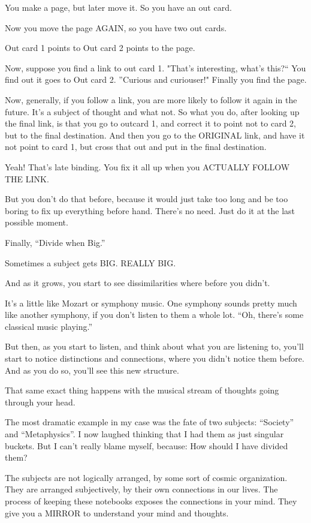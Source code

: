 \documentclass[oneside]{book}
\begin{document}
You make a page, but later move it. So you have an out card.

Now you move the page AGAIN, so you have two out cards.

Out card 1 points to Out card 2 points to the page.

Now, suppose you find a link to out card 1. "That's interesting,
what's this?`` You find out it goes to Out card 2. ''Curious and
curiouser!" Finally you find the page.

Now, generally, if you follow a link, you are more likely to follow it
again in the future. It's a subject of thought and what not. So what
you do, after looking up the final link, is that you go to outcard 1,
and correct it to point not to card 2, but to the final
destination. And then you go to the ORIGINAL link, and have it not
point to card 1, but cross that out and put in the final destination.

Yeah! That's late binding. You fix it all up when you ACTUALLY FOLLOW
THE LINK.

But you don't do that before, because it would just take too long and
be too boring to fix up everything before hand. There's no need. Just
do it at the last possible moment.

Finally, ``Divide when Big.''

Sometimes a subject gets BIG. REALLY BIG.

And as it grows, you start to see dissimilarities where before you
didn't.

It's a little like Mozart or symphony music. One symphony sounds
pretty much like another symphony, if you don't listen to them a whole
lot. ``Oh, there's some classical music playing.''

But then, as you start to listen, and think about what you are
listening to, you'll start to notice distinctions and connections,
where you didn't notice them before. And as you do so, you'll see this
new structure.

That same exact thing happens with the musical stream of thoughts
going through your head.

The most dramatic example in my case was the fate of two subjects:
``Society'' and ``Metaphysics''. I now laughed thinking that I had them as
just singular buckets. But I can't really blame myself, because: How
should I have divided them?

The subjects are not logically arranged, by some sort of cosmic
organization. They are arranged subjectively, by their own connections
in our lives. The process of keeping these notebooks exposes the
connections in your mind. They give you a MIRROR to understand your
mind and thoughts.
\end{document}
